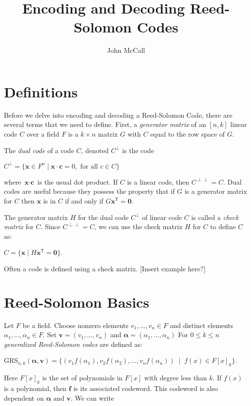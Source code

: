 \documentclass{article}
\title{Encoding and Decoding Reed-Solomon Codes}
\author{John McCall}
\begin{document}

\maketitle

\section{Definitions}
Before we delve into encoding and decoding a Reed-Solomon Code, there are several terms that we need to define. First, a \textit{generator matrix} of an $[n,k]$ linear code $C$ over a field $F$ is a $k \times n$ matrix $G$ with $C$ equal to the row space of $G$. 

The \textit{dual code} of a code $C$, denoted $C^{\perp}$ is the code
\begin{center}
$C^{\perp} = \{\textbf{x} \in F^{n} \mid \textbf{x} \cdot \textbf{c} = 0, \text{ for all } c \in C\}$
\end{center}
where $\textbf{x} \cdot \textbf{c}$ is the usual dot product. If $C$ is a linear code, then $C^{\perp \perp} = C$. Dual codes are useful because they possess the property that if $G$ is a generator matrix for $C$ then $\textbf{x}$ is in $C$ if and only if $G\textbf{x}^{\mathsf{T}} = \textbf{0}$.

The generator matrix $H$ for the dual code $C^{\perp}$ of linear code $C$ is called a \textit{check matrix} for $C$. Since $C^{\perp \perp} = C$, we can use the check matrix $H$ for $C$ to define $C$ as:
\begin{center}
$C = \{\textbf{x} \mid H\textbf{x}^{\mathsf{T}} = \textbf{0}\}$.
\end{center}
Often a code is defined using a check matrix. [Insert example here?]

\section{Reed-Solomon Basics}
Let $F$ be a field. Choose nonzero elements $v_{1},..., v_{n} \in F$ and distinct elements $\alpha_{1},...,\alpha_{n} \in F$. Set $\textbf{v} = (v_{1},..., v_{n})$ and $\boldsymbol\alpha = (\alpha_{1},...,\alpha_{n})$ For $0 \le k \le n$ \textit{generalized Reed-Solomon codes} are defined as:
\begin{center}
$\text{GRS}_{n,k}(\boldsymbol\alpha, \textbf{v}) = \{(v_{1}f(\alpha_{1}),v_{2}f(\alpha_{2}),...,v_{n}f(\alpha_{n}))\;\mid\;f(x) \in F[x]_{k}\}$.
\end{center}
Here $F[x]_{k}$ is the set of polynomials in $F[x]$ with degree less than $k$. If $f(x)$ is a polynomial, then $\textbf{f}$ is its associated codeword. This codeword is also dependent on $\boldsymbol\alpha \text{ and } \textbf{v}$. We can write
\end{document}
